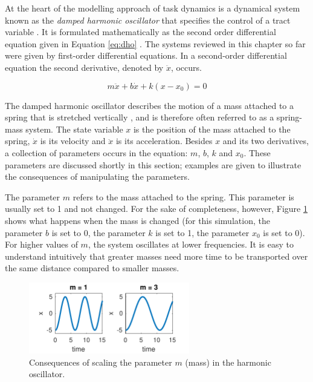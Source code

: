 At the heart of the modelling approach of task dynamics is a dynamical system known as the \emph{damped harmonic oscillator} that specifies the control of a tract variable \citep{Hawkins1992}. It is formulated mathematically as the second order differential equation given in Equation \ref{eq:dho} \citep{SaltzmanKelso1987}. The systems reviewed in this chapter so far were given by first-order differential equations. In a second-order differential equation the second derivative, denoted by $\ddot{x}$, occurs.

\begin{equation}
m\ddot{x} + b\dot{x} + k(x-x_0) = 0
\label{eq:dho}
\end{equation}

The damped harmonic oscillator describes the motion of a mass attached to a spring that is stretched vertically \citep{FeynmanLeightonSands1963}, and is therefore often referred to as a spring-mass system. The state variable $x$ is the position of the mass attached to the spring, $\dot{x}$ is its velocity and $\ddot{x}$ is its acceleration. Besides $x$ and its two derivatives, a collection of parameters occurs in the equation: $m$, $b$, $k$ and $x_0$. These parameters are discussed shortly in this section; examples are given to illustrate the consequences of manipulating the parameters. 

The parameter $m$ refers to the mass attached to the spring. This parameter is usually set to 1 and not changed. For the sake of completeness, however, Figure \ref{fig:dho_mass}  shows what happens when the mass is changed (for this simulation, the parameter $b$ is set to 0, the parameter $k$ is set to 1, the parameter $x_0$ is set to 0). For higher values of $m$, the system oscillates at lower frequencies. It is easy to understand intuitively that greater masses need more time to be transported over the same distance compared to smaller masses. 

\begin{figure}[htp]
\begin{center}
\includegraphics[width=7cm]{figures/ch3/dho_mass.pdf}
\caption{Consequences of scaling the parameter $m$ (mass) in the harmonic oscillator.}
\label{fig:dho_mass}
\end{center}
\end{figure}

